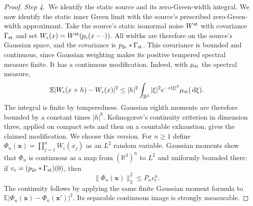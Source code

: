 \documentclass[12pt,oneside,openany]{book}
\numberwithin{equation}{section}
\theoremstyle{nogostyle}
\theoremstyle{definition}
\newcommand{\R}{\mathbb{R}}
\newcommand{\E}{\mathbb{E}}
\newcommand{\ud}{\,\mathrm{d}}
\begin{document}
\begin{proof}
  \medskip
  \noindent\textit{Step 4.~}We identify the static source and its
  zero-Green-width integral.
  We now identify the static inner Green limit with the source's prescribed
  zero-Green-width approximant. Take the source's static isonormal noise $W^{\rm
  st}$ with covariance $\Gamma_{\rm st}$ and set $W_\epsilon(x) = W^{\rm
  st}(p_\epsilon(x-\cdot))$. All widths are therefore on the source's Gaussian
  space, and the covariance is $p_{2\epsilon}*\Gamma_{\rm st}$. This covariance
  is bounded and continuous, since Gaussian weighting makes its positive
  tempered spectral measure finite. It has a continuous modification. Indeed,
  with $\mu_{\rm st}$ the spectral measure,
  \[
    \E|W_\epsilon(x+h)-W_\epsilon(x)|^2
    \le |h|^2\int_{\R^3}|\xi|^2e^{-\epsilon|\xi|^2}
    \mu_{\rm st}(\ud\xi).
  \]
  The integral is finite by temperedness. Gaussian eighth moments are therefore
  bounded by a constant times $|h|^8$. Kolmogorov's continuity criterion in
  dimension three, applied on compact sets and then on a countable exhaustion,
  gives the claimed modification. We choose this version. For $n \ge 1$ define
  $\Phi_n(\mathbf{x}) = \prod_{j=1}^n W_\epsilon(x_j)$ as an $L^2$ random
  variable. Gaussian moments show that $\Phi_n$ is continuous as a map from
  $(\R^3)^n$ to $L^2$ and uniformly bounded there: if $v_\epsilon =
  (p_{2\epsilon}*\Gamma_{\rm st})(0)$, then
  \[
    \|\Phi_n(\mathbf{x})\|_2^2\le P_n v_\epsilon^n.
  \]
  The continuity follows by applying the same finite Gaussian moment formula to
  $\E|\Phi_n(\mathbf{x})-\Phi_n(\mathbf{x}')|^2$. Its separable continuous image
  is strongly measurable.


\end{proof}
\end{document}

